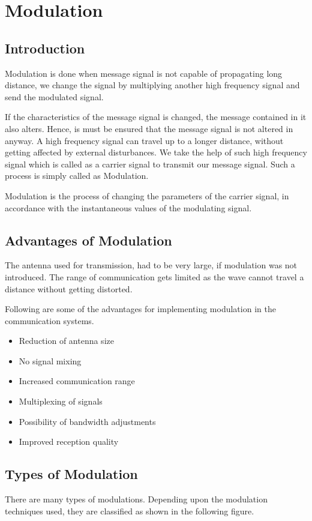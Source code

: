 \chapter{Modulation}

\section{Introduction}
Modulation is done when message signal is not capable of propagating long distance, we change the signal by multiplying another high frequency signal and send the modulated signal.

\par If the characteristics of the message signal is changed, the message contained in it also alters. Hence, is must be ensured that the message signal is not altered in anyway. A high frequency signal can travel up to a longer distance, without getting affected by external disturbances. We take the help of such high frequency signal which is called as a carrier signal to transmit our message signal. Such a process is simply called as Modulation.

Modulation is the process of changing the parameters of the carrier signal, in accordance with the instantaneous values of the modulating signal.

\section{Advantages of Modulation}
The antenna used for transmission, had to be very large, if modulation was not introduced. The range of communication gets limited as the wave cannot travel a distance without getting distorted.

Following are some of the advantages for implementing modulation in the communication systems.

\begin{itemize}
  \item Reduction of antenna size
  \item No signal mixing
  \item Increased communication range
  \item Multiplexing of signals
  \item Possibility of bandwidth adjustments
  \item Improved reception quality

\end{itemize}

\section{Types of Modulation}
There are many types of modulations. Depending upon the modulation techniques used, they are classified as shown in the following figure.


